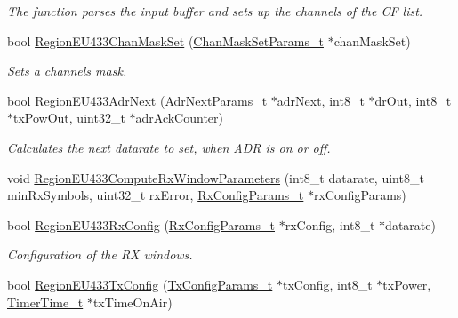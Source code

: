\begin{DoxyCompactItemize}
\begin{DoxyCompactList}\small\item\em The function parses the input buffer and sets up the channels of the CF list. \end{DoxyCompactList}\item 
bool \mbox{\hyperlink{group___r_e_g_i_o_n_e_u433_ga9f5e0e0881857bae99067d739c037882}{Region\+E\+U433\+Chan\+Mask\+Set}} (\mbox{\hyperlink{group___r_e_g_i_o_n_ga6d24f7da136006410827dfb29f6b9b9e}{Chan\+Mask\+Set\+Params\+\_\+t}} $\ast$chan\+Mask\+Set)
\begin{DoxyCompactList}\small\item\em Sets a channels mask. \end{DoxyCompactList}\item 
bool \mbox{\hyperlink{group___r_e_g_i_o_n_e_u433_ga97dd9f8ccc0f0e354e4ccc2e3b3d4e6c}{Region\+E\+U433\+Adr\+Next}} (\mbox{\hyperlink{group___r_e_g_i_o_n_ga567c2742622326b350b4e91bbf61b4ce}{Adr\+Next\+Params\+\_\+t}} $\ast$adr\+Next, int8\+\_\+t $\ast$dr\+Out, int8\+\_\+t $\ast$tx\+Pow\+Out, uint32\+\_\+t $\ast$adr\+Ack\+Counter)
\begin{DoxyCompactList}\small\item\em Calculates the next datarate to set, when A\+DR is on or off. \end{DoxyCompactList}\item 
void \mbox{\hyperlink{group___r_e_g_i_o_n_e_u433_ga5e88bc1903bb61a90df88fe8c1805705}{Region\+E\+U433\+Compute\+Rx\+Window\+Parameters}} (int8\+\_\+t datarate, uint8\+\_\+t min\+Rx\+Symbols, uint32\+\_\+t rx\+Error, \mbox{\hyperlink{group___r_e_g_i_o_n_ga375c038078dfcfc7ef14280021db719e}{Rx\+Config\+Params\+\_\+t}} $\ast$rx\+Config\+Params)
\item 
bool \mbox{\hyperlink{group___r_e_g_i_o_n_e_u433_ga3a7bb7e75de6bfc5ef4edc1c934f5a50}{Region\+E\+U433\+Rx\+Config}} (\mbox{\hyperlink{group___r_e_g_i_o_n_ga375c038078dfcfc7ef14280021db719e}{Rx\+Config\+Params\+\_\+t}} $\ast$rx\+Config, int8\+\_\+t $\ast$datarate)
\begin{DoxyCompactList}\small\item\em Configuration of the RX windows. \end{DoxyCompactList}\item 
bool \mbox{\hyperlink{group___r_e_g_i_o_n_e_u433_ga29a68f1a72dfccfe89f01de36ddc542b}{Region\+E\+U433\+Tx\+Config}} (\mbox{\hyperlink{group___r_e_g_i_o_n_gabed730d4d04b0b60d4b6d1966d3f21d3}{Tx\+Config\+Params\+\_\+t}} $\ast$tx\+Config, int8\+\_\+t $\ast$tx\+Power, \mbox{\hyperlink{utilities_8h_a4215ca43d3e953099ea758ce428599d0}{Timer\+Time\+\_\+t}} $\ast$tx\+Time\+On\+Air)

\end{DoxyCompactItemize}
